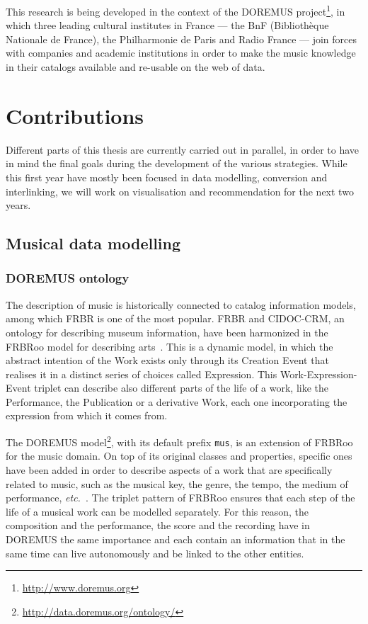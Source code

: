 \documentclass[a4paper,11pt]{report}
\begin{document}
This research is being developed in the context of the DOREMUS project\footnote{\url{http://www.doremus.org}}, in which three leading cultural institutes in France --- the BnF (Biblioth\`eque Nationale de France), the Philharmonie de Paris and Radio France --- join forces with companies and academic institutions in order to make the music knowledge in their catalogs available and re-usable on the web of data.

\chapter{Contributions}

Different parts of this thesis are currently carried out in parallel, in order to have in mind the final goals during the development of the various strategies. While this first year have mostly been focused in data modelling, conversion and interlinking, we will work on visualisation and recommendation for the next two years.

\section{Musical data modelling} \label{model}

\subsection{DOREMUS ontology}

The description of music is historically connected to catalog information models, among which FRBR is one of the most popular. FRBR and CIDOC-CRM, an ontology for describing museum information, have been harmonized in the FRBRoo model for describing arts~\cite{doerr2008frbroo}. This is a dynamic model, in which the abstract intention of the Work exists only through its Creation Event that realises it in a distinct series of choices called Expression. This Work-Expression-Event triplet can describe also different parts of the life of a work, like the Performance, the Publication or a derivative Work, each one incorporating the expression from which it comes from.

The DOREMUS model\footnote{\url{http://data.doremus.org/ontology/}}, with its default prefix \texttt{mus}, is an extension of FRBRoo for the music domain. On top of its original classes and properties, specific ones have been added in order to describe aspects of a work that are specifically related to music, such as the musical key, the genre, the tempo, the medium of performance, {\it etc.}~\cite{choffe2016doremus}. The triplet pattern of FRBRoo ensures that each step of the life of a musical work can be modelled separately. For this reason, the composition and the performance, the score and the recording have in DOREMUS the same importance and each contain an information that in the same time can live autonomously and be linked to the other entities.
\end{document}
